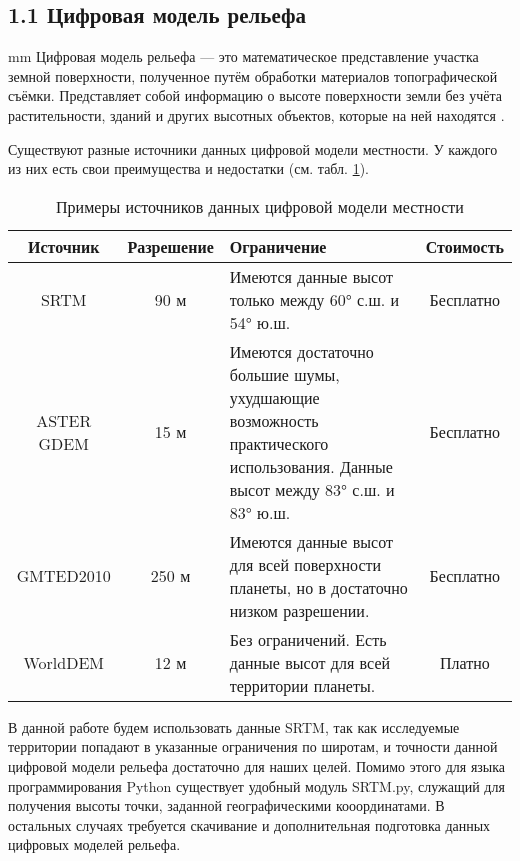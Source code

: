 \subsection*{\Large{1.1 Цифровая модель рельефа}}
 mm
Цифровая модель рельефа --- это математическое представление участка земной поверхности, полученное путём обработки материалов топографической съёмки. Представляет собой информацию о высоте поверхности земли без учёта растительности, зданий и других высотных объектов, которые на ней находятся \cite{DEM}.
\par
Существуют разные источники данных цифровой модели местности. У каждого из них есть свои преимущества и недостатки (см. табл. \ref{tabular:dem}).  
\begin{table}[H]
	\centering
	\caption{Примеры источников данных цифровой модели местности}
	\label{tabular:dem} 
	\begin{tabular}{|c|c|p{8cm}|c|}
		\hline
		\textbf{Источник}     &  \textbf{Разрешение} & \textbf{Ограничение} & \textbf{Стоимость} \\ \hline
		SRTM \cite{SRTM} & 90 м & Имеются данные высот только между 60° с.ш. и 54° ю.ш. & Бесплатно  \\ \hline
		ASTER GDEM \cite{ASTER} & 15 м & Имеются достаточно большие шумы, ухудшающие возможность практического использования. Данные высот между 83° с.ш. и 83° ю.ш.  & Бесплатно  \\ \hline
		GMTED2010 \cite{GMTED2010} & 250 м & Имеются данные высот для всей поверхности планеты, но в достаточно низком разрешении.  & Бесплатно  \\ \hline
		WorldDEM \cite{WorldDEM} & 12 м & Без ограничений. Есть данные высот для всей территории планеты. & Платно  \\ \hline
	\end{tabular}
\end{table}
\vspace{4mm}
\par
В данной работе будем использовать данные SRTM, так как исследуемые территории попадают в указанные ограничения по широтам, и точности данной цифровой модели рельефа достаточно для наших целей. Помимо этого  для языка программирования Python существует удобный модуль SRTM.py, служащий для получения высоты точки, заданной географическими кооординатами. В остальных случаях требуется скачивание и дополнительная подготовка данных цифровых моделей рельефа.
